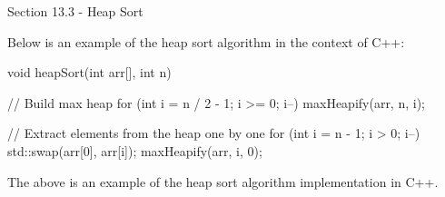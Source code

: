 \begin{notes}{Section 13.3 - Heap Sort}
    \begin{highlight}
        Below is an example of the heap sort algorithm in the context of C++:
    
    \begin{code}[C++]
    void heapSort(int arr[], int n) {
        // Build max heap
        for (int i = n / 2 - 1; i >= 0; i--)
            maxHeapify(arr, n, i);
    
        // Extract elements from the heap one by one
        for (int i = n - 1; i > 0; i--) {
            std::swap(arr[0], arr[i]);
            maxHeapify(arr, i, 0);
        }
    }
    \end{code}
        The above is an example of the heap sort algorithm implementation in C++.
    \end{highlight}
\end{notes}


